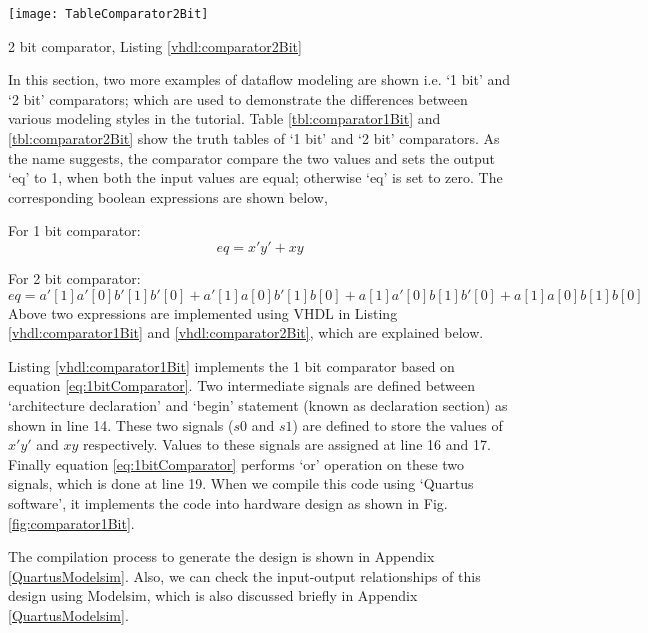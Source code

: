 \begin{table}
	\centering
	\texttt{[image: TableComparator2Bit]}
	\caption{2 bit comparator, Listing \ref{vhdl:comparator2Bit}}
	\label{tbl:comparator2Bit}
\end{table}

In this section, two more examples of dataflow modeling are shown i.e. `1 bit' and `2 bit' comparators; which are used to demonstrate the differences between various modeling styles in the tutorial. Table \ref{tbl:comparator1Bit} and \ref{tbl:comparator2Bit} show the truth tables of `1 bit' and `2 bit' comparators.  As the name suggests, the comparator compare the two values and sets the output `eq' to 1, when both the input values are equal; otherwise `eq' is set to zero. The corresponding boolean expressions are shown below, 

For 1 bit comparator: 
\begin{equation}
	eq = x' y' + x y
	\label{eq:1bitComparator}
\end{equation} 

For 2 bit comparator: 
\begin{equation}
	eq = a'[1]a'[0]b'[1]b'[0] + a'[1]a[0]b'[1]b[0] + a[1]a'[0]b[1]b'[0] + a[1]a[0]b[1]b[0]
	\label{eq:2bitComparator}
\end{equation} 
Above two expressions are implemented using VHDL in Listing \ref{vhdl:comparator1Bit} and \ref{vhdl:comparator2Bit}, which are explained below.

\begin{explanation}
	Listing \ref{vhdl:comparator1Bit} implements the 1 bit comparator based on equation \ref{eq:1bitComparator}. Two intermediate signals are defined between `architecture declaration' and `begin' statement (known as declaration section) as shown in line 14. These two signals ($s0$ and $s1$) are defined to store the values of $x'y'$ and $xy$ respectively. Values to these signals are assigned at line 16 and 17. Finally equation \ref{eq:1bitComparator} performs `or' operation on these two signals, which is done at line 19. When we compile this code using `Quartus software', it implements the code into hardware design as shown in Fig. \ref{fig:comparator1Bit}.
	
	The compilation process to generate the design is shown in Appendix \ref{QuartusModelsim}. Also, we can check the input-output relationships of this design using Modelsim, which is also discussed briefly in Appendix \ref{QuartusModelsim}.   
\end{explanation}


